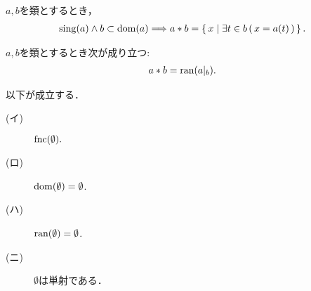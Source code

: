 	\begin{screen}
		\begin{thm}
			$a,b$を類とするとき，
			\begin{align}
				\operatorname*{sing} (a) \wedge b \subset \operatorname*{dom} (a) \Longrightarrow
				a \ast b = \left\{\, x \mid \exists t \in b\, (\, x = a(t)\, )\, \right\}.
			\end{align}
		\end{thm}
	\end{screen}
	
	\begin{screen}
		\begin{thm}[像は制限写像の値域に等しい]
			$a,b$を類とするとき次が成り立つ:
			\begin{align}
				a \ast b = \operatorname*{ran} (a|_b).
			\end{align}
		\end{thm}
	\end{screen}
	
	\begin{screen}
		\begin{thm}[空集合は写像である]\label{thm:emptyset_is_a_mapping}
			以下が成立する．
			\begin{description}
				\item[(イ)] $\operatorname*{fnc} (\emptyset).$
				\item[(ロ)] $\operatorname*{dom} (\emptyset) = \emptyset$.
				\item[(ハ)] $\operatorname*{ran} (\emptyset) = \emptyset$.
				\item[(ニ)] $\emptyset$は単射である．
			\end{description}
		\end{thm}
	\end{screen}
	
